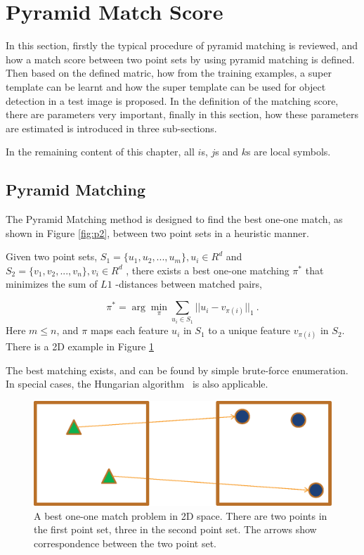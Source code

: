 \section{Pyramid Match Score}

\label{dt5}
In this section, firstly the typical procedure of pyramid matching is reviewed, and how a match score between two point sets by using pyramid matching is defined. Then based on the defined matric, how from the training examples, a super template can be learnt and how the super template can be used for object detection in a test image is proposed. In the definition of the matching score, there are parameters very important, finally in this section, how these parameters are estimated is introduced in three sub-sections.

In the remaining content of this chapter, all $i$s, $j$s and $k$s are local symbols.
\subsection{Pyramid Matching}



The Pyramid Matching method is designed to find the best one-one match, as shown in Figure \ref{fig:p2}, between two point sets in a heuristic manner.

Given two point sets, ${S_1} = \{ {u_1},{u_2},...,{u_m}\}, u_i \in {R^d}
$
 and ${S_2} = \{ {v_1},{v_2},...,{v_n}\}, v_i \in {R^d}$
, there exists a best one-one matching ${\pi}^*$ that minimizes the sum of $L1$
-distances between matched pairs,

\[
{\pi ^*} = \arg \mathop {\min }\limits_\pi  \sum\limits_{{u_i} \in {S_1}} {||{u_i} - {v_{\pi (i)}}|{|_1}} \ .
\]
Here $m  \le n$, and $\pi$ maps each feature $u_i$ in $S_1$ to a unique feature ${{v_{\pi (i)}}}
$ in $S_2$. There is a 2D example in Figure \ref{fig:pms1}

The best matching exists, and can be found by simple brute-force enumeration. In special cases, the Hungarian algorithm~\citep{ha} is also applicable.

\begin{figure}
\centering
\includegraphics[width=1\textwidth]{pms1.eps}
\caption[Best one-one match]{A best one-one match problem in 2D space. There are two points in the first point set, three in the second point set. The arrows show correspondence between the two point set.}
\label{fig:pms1}
\end{figure}

